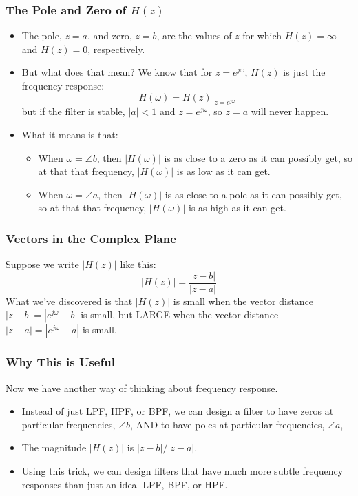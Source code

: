 \documentclass{beamer}
\begin{document}
\begin{frame}
  \frametitle{The Pole and Zero of $H(z)$}

  \begin{itemize}
  \item The pole, $z=a$, and zero, $z=b$, are the values of $z$ for which
    $H(z)=\infty$  and $H(z)=0$, respectively.
  \item But what does that mean?  We know that for $z=e^{j\omega}$,
    $H(z)$ is just the frequency response:
    \[
    H(\omega) = H(z)\vert_{z=e^{j\omega}}
    \]
    but if the filter is stable, $|a|<1$ and $z=e^{j\omega}$, so
    $z=a$ will never happen. 
  \item What it means is that:
    \begin{itemize}
      \item When $\omega=\angle b$, then
        $|H(\omega)|$ is as close to a zero as it can possibly get, so at that 
        that frequency, $|H(\omega)|$ is as low as it can get.
      \item When $\omega=\angle a$, then
        $|H(\omega)|$ is as close to a pole as it can possibly get, so at that 
        that frequency, $|H(\omega)|$ is as high as it can get.
    \end{itemize}
  \end{itemize}
\end{frame}

\begin{frame}
  \frametitle{Vectors in the Complex Plane}

  Suppose we write $|H(z)|$ like this:
  \[
  \vert H(z)\vert = \frac{\vert z-b\vert}{\vert z-a\vert}
  \]
  What we've discovered is that $|H(z)|$ is small when the vector
  distance $|z-b|=|e^{j\omega}-b|$ is small, but LARGE when the vector
  distance $|z-a|=|e^{j\omega}-a|$ is small.
\end{frame}

\begin{frame}
  \centerline{}
\end{frame}

\begin{frame}
  \centerline{}
\end{frame}

\begin{frame}
  \frametitle{Why This is Useful}

  Now we have another way of thinking about frequency response.
  \begin{itemize}
    \item Instead of just LPF, HPF, or BPF, we can design a filter to have
      zeros at particular frequencies, $\angle b$, AND to have
      poles at particular frequencies, $\angle a$,
    \item The magnitude $|H(z)|$ is
      $|z-b|/|z-a|$.
    \item Using this trick, we can design filters that have much more
      subtle frequency responses than just an ideal LPF, BPF, or HPF.
  \end{itemize}
\end{frame}
\end{document}
